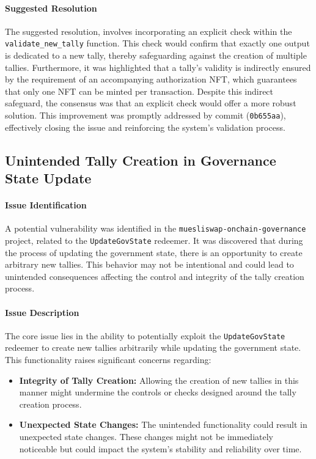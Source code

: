 \documentclass[11pt]{article}
\begin{document}
\paragraph{Suggested Resolution}
The suggested resolution, involves incorporating an explicit check within the \texttt{validate\_new\_tally} function.
This check would confirm that exactly one output is dedicated to a new tally, thereby safeguarding against the creation of multiple tallies.
Furthermore, it was highlighted that a tally's validity is indirectly ensured by the requirement of an accompanying authorization NFT, which guarantees that only one NFT can be minted per transaction.
Despite this indirect safeguard, the consensus was that an explicit check would offer a more robust solution.
This improvement was promptly addressed by commit (\texttt{0b655aa}), effectively closing the issue and reinforcing the system's validation process.

\subsection{Unintended Tally Creation in Governance State Update}

\paragraph{Issue Identification}
A potential vulnerability was identified in the \texttt{muesliswap-onchain-governance} project, related to the \texttt{UpdateGovState} redeemer.
It was discovered that during the process of updating the government state, there is an opportunity to create arbitrary new tallies.
This behavior may not be intentional and could lead to unintended consequences affecting the control and integrity of the tally creation process.

\paragraph{Issue Description}
The core issue lies in the ability to potentially exploit the \texttt{UpdateGovState} redeemer to create new tallies arbitrarily while updating the government state.
This functionality raises significant concerns regarding:
\begin{itemize}
    \item \textbf{Integrity of Tally Creation:} Allowing the creation of new tallies in this manner might undermine the controls or checks designed around the tally creation process.
    \item \textbf{Unexpected State Changes:} The unintended functionality could result in unexpected state changes. These changes might not be immediately noticeable but could impact the system's stability and reliability over time.
\end{itemize}
\end{document}
